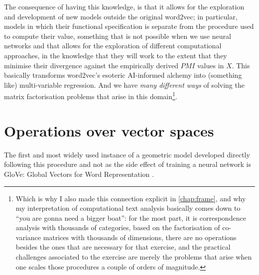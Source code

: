The consequence of having this knowledge, is that it allows for the exploration and development of new models outside the original word2vec; in particular, models in which their functional specification is separate from the procedure used to compute their value, something that is not possible when we use neural networks and that allows for the exploration of different computational approaches, in the knowledge that they will work to the extent that they minimise their divergence against the empirically derived $PMI$ values in $X$.
This basically transforms word2vec's esoteric AI-informed alchemy into (something like) multi-variable regression.
And we have \emph{many different ways} of solving the matrix factorisation problems that arise in this domain\footnote{
    Which is why I also made this connection explicit in \autoref{chap:frame}, and why my interpretation of computational text analysis basically comes down to ``you are gonna need a bigger boat'': for the most part, it is correspondence analysis with thousands of categories, based on the factorisation of co-variance matrices with thousands of dimensions, there are no operations besides the ones that are necessary for that exercise, and the practical challenges associated to the exercise are merely the problems that arise when one scales those procedures a couple of orders of magnitude.
}.

\section{Operations over vector spaces}
\label{sec:wspace_ops}

The first and most widely used instance of a geometric model developed directly following this procedure and not as the side effect of training a neural network is GloVe: Global Vectors for Word Representation \citep{pennington2014}.

